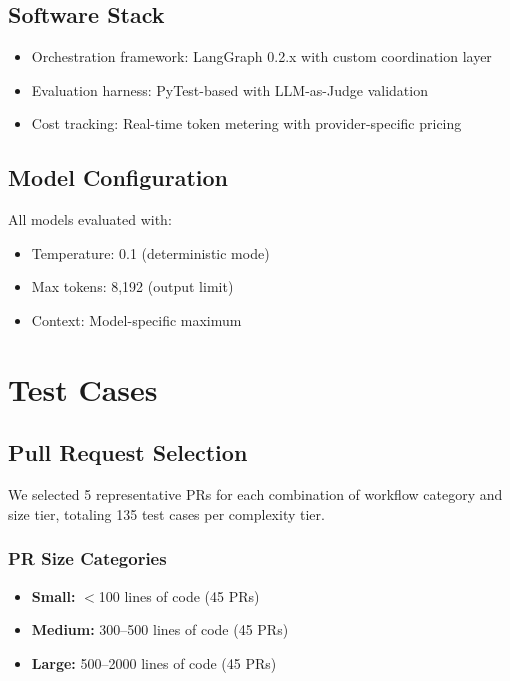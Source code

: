 \documentclass[11pt]{article}
\begin{document}
\subsection{Software Stack}
\begin{itemize}
    \item Orchestration framework: LangGraph 0.2.x with custom coordination layer
    \item Evaluation harness: PyTest-based with LLM-as-Judge validation
    \item Cost tracking: Real-time token metering with provider-specific pricing
\end{itemize}

\subsection{Model Configuration}
All models evaluated with:
\begin{itemize}
    \item Temperature: 0.1 (deterministic mode)
    \item Max tokens: 8,192 (output limit)
    \item Context: Model-specific maximum
\end{itemize}

\section{Test Cases}

\subsection{Pull Request Selection}
We selected 5 representative PRs for each combination of workflow category and size tier, totaling 135 test cases per complexity tier.

\subsubsection{PR Size Categories}
\begin{itemize}
    \item \textbf{Small:} $<$100 lines of code (45 PRs)
    \item \textbf{Medium:} 300--500 lines of code (45 PRs)
    \item \textbf{Large:} 500--2000 lines of code (45 PRs)
\end{itemize}
\end{document}
